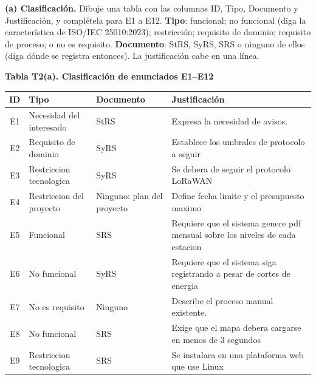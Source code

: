 \documentclass[11pt]{article}
\renewcommand{\arraystretch}{1.25}
\begin{document}
\begin{cajatarea}[title={T2. Clasificación y auditoría \hfill D2 · 30\,\%}]

\textbf{(a) Clasificación.} Dibuje una tabla con las columnas ID, Tipo, Documento y Justificación, y complétela para E1 a E12. \textbf{Tipo}: funcional; no funcional (diga la característica de ISO/IEC 25010:2023); restricción; requisito de dominio; requisito de proceso; o no es requisito. \textbf{Documento}: StRS, SyRS, SRS o ninguno de ellos (diga dónde se registra entonces). La justificación cabe en una línea.

\medskip
\textbf{Tabla T2(a). Clasificación de enunciados E1--E12}

\begingroup
\scriptsize
\setlength{\tabcolsep}{3pt}
\renewcommand{\arraystretch}{1.25}

\begin{tabularx}{\linewidth}{|c|p{2.8cm}|p{2.2cm}|X|}
\hline
\textbf{ID} & \textbf{Tipo} & \textbf{Documento} & \textbf{Justificación} \\
\hline

E1 & Necesidad del interesado & StRS &
Expresa la necesidad de avisos. \\
\hline

E2 & Requisito de dominio & SyRS &
Establece los umbrales de protocolo a seguir\\
\hline

E3 & Restriccion tecnologica & SyRS &
Se debera de seguir el protocolo LoRaWAN \\
\hline

E4 & Restriccion del proyecto & Ninguno: plan del proyecto &
Define fecha limite y el presupuesto maximo \\
\hline

E5 & Funcional & SRS &
Requiere que el sistema genere pdf mensual sobre los niveles de cada estacion \\
\hline

E6 & No funcional & SyRS &
Requiere que el sistema siga registrando a pesar de cortes de energia \\
\hline

E7 & No es requisito & Ninguno&
Describe el proceso manual existente. \\
\hline

E8 & No funcional & SRS &
Exige que el mapa debera cargarse en menos de 3 segundos \\
\hline

E9 & Restriccion tecnologica & SRS &
Se instalara en una plataforma web que use Linux \\
\hline


\end{tabularx}
\end{cajatarea}
\end{document}
